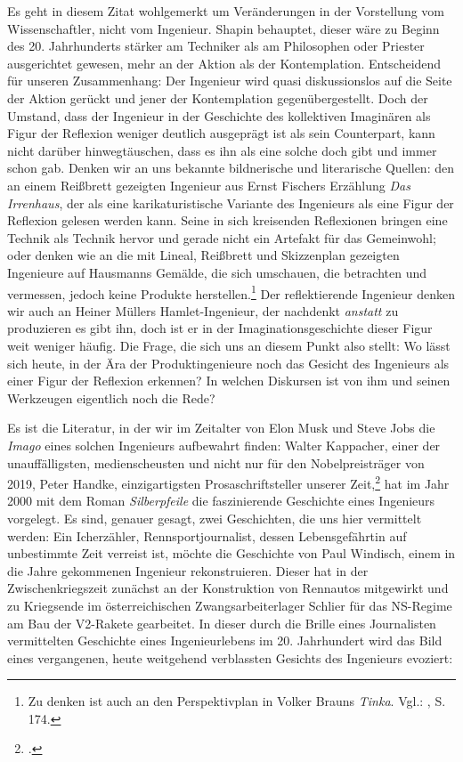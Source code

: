 \documentclass[%
	fontsize=10pt,%
	twoside,%
	headings=optiontoheadandtoc,%
	showtrims]{scrbook}
\renewenvironment{quote}{%
  \addmargin[\genericindent]{0pt}%
  \KOMAoptions{parskip=true}%
  \ifdim\parskip>0pt\else\addvspace{\intextsep}\fi
}{%
  \par
  \endaddmargin\vspace{\intextsep}
}
\begin{document}
\par Es geht in diesem Zitat \textendash{} wohlgemerkt \textendash{} um Veränderungen in der Vorstellung vom Wissenschaftler, nicht vom Ingenieur. Shapin behauptet, dieser wäre zu Beginn des 20. Jahrhunderts stärker am Techniker als am Philosophen oder Priester ausgerichtet gewesen, mehr an der Aktion als der Kontemplation. Entscheidend für unseren Zusammenhang: Der Ingenieur wird quasi diskussionslos auf die Seite der Aktion gerückt und jener der Kontemplation gegenübergestellt. Doch der Umstand, dass der Ingenieur in der Geschichte des kollektiven Imaginären als Figur der Reflexion weniger deutlich ausgeprägt ist als sein Counterpart, kann nicht darüber hinwegtäuschen, dass es ihn als eine solche doch gibt und immer schon gab. Denken wir an uns bekannte bildnerische und literarische Quellen: den an einem Reißbrett gezeigten Ingenieur aus Ernst Fischers Erzählung \emph{Das Irrenhaus}, der als eine karikaturistische Variante des Ingenieurs als eine Figur der Reflexion gelesen werden kann. Seine in sich kreisenden Reflexionen bringen eine Technik als Technik hervor und gerade nicht ein Artefakt für das Gemeinwohl; oder denken wie an die mit Lineal, Reißbrett und Skizzenplan gezeigten Ingenieure auf Hausmanns Gemälde, die sich umschauen, die betrachten und vermessen, jedoch keine Produkte herstellen.\footnote{Zu denken ist auch an den Perspektivplan in Volker Brauns \emph{Tinka}. Vgl.: \cite[][]{braun1990a}, S. 174.}  Der reflektierende Ingenieur \textendash{} denken wir auch an Heiner Müllers Hamlet-Ingenieur, der nachdenkt \emph{anstatt} zu produzieren \textendash{} es gibt ihn, doch ist er in der Imaginationsgeschichte dieser Figur weit weniger häufig. Die Frage, die sich uns an diesem Punkt also stellt: Wo lässt sich heute, in der Ära der Produktingenieure noch das Gesicht des Ingenieurs als einer Figur der Reflexion erkennen? In welchen Diskursen ist von ihm und seinen Werkzeugen eigentlich noch die Rede?\par Es ist die Literatur, in der wir im Zeitalter von Elon Musk und Steve Jobs die \emph{Imago} eines solchen Ingenieurs aufbewahrt finden: Walter Kappacher, einer der unauffälligsten, medienscheusten und nicht nur für den Nobelpreisträger von 2019, Peter Handke, einzigartigsten Prosaschriftsteller unserer Zeit,\footnote{\cite[][]{handke2007a}.}  hat im Jahr 2000 mit dem Roman \emph{Silberpfeile} die faszinierende Geschichte eines Ingenieurs vorgelegt. Es sind, genauer gesagt, zwei Geschichten, die uns hier vermittelt werden: Ein Icherzähler, Rennsportjournalist, dessen Lebensgefährtin auf unbestimmte Zeit verreist ist, möchte die Geschichte von Paul Windisch, einem in die Jahre gekommenen Ingenieur rekonstruieren. Dieser hat in der Zwischenkriegszeit zunächst an der Konstruktion von Rennautos mitgewirkt und zu Kriegsende im österreichischen Zwangsarbeiterlager Schlier für das NS-Regime am Bau der V2-Rakete gearbeitet. In dieser durch die Brille eines Journalisten vermittelten Geschichte eines Ingenieurlebens im 20. Jahrhundert wird das Bild eines vergangenen, heute weitgehend verblassten Gesichts des Ingenieurs evoziert:\begin{quote}

\end{quote}
\end{document}
